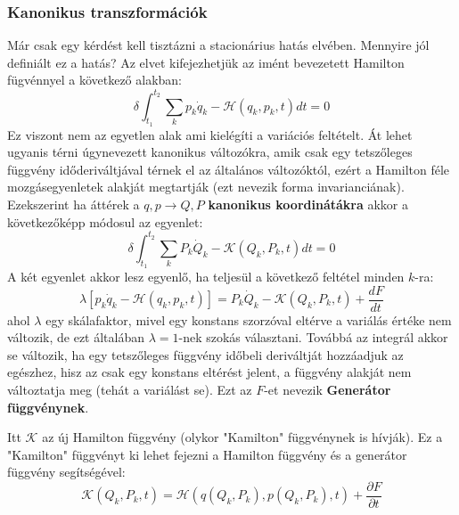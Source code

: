 \documentclass[../main.tex]{subfiles}
\begin{document}
\subsubsection{Kanonikus transzformációk}
Már csak egy kérdést kell tisztázni a stacionárius hatás elvében. Mennyire jól definiált ez a hatás? Az elvet kifejezhetjük az imént bevezetett Hamilton fügvénnyel a következő alakban:
\begin{equation}
    \delta \int_{t_1}^{t_2} \sum_k p_k \dot{q}_k - \mathcal{H}(q_k, p_k, t) dt = 0
\end{equation}
Ez viszont nem az egyetlen alak ami kielégíti a variációs feltételt. Át lehet ugyanis térni úgynevezett kanonikus változókra, amik csak egy tetszőleges függvény időderiváltjával térnek el az általános változóktól, ezért a Hamilton féle mozgásegyenletek alakját megtartják (ezt nevezik forma invarianciának). Ezekszerint ha áttérek a $q,p \to Q,P$ \textbf{kanonikus koordinátákra} akkor a következőképp módosul az egyenlet:
\begin{equation}
    \delta \int_{t_1}^{t_2} \sum_k P_k \dot{Q}_k - \mathcal{K}(Q_k, P_k, t) dt = 0
\end{equation}
A két egyenlet akkor lesz egyenlő, ha teljesül a következő feltétel minden $k$-ra:
\begin{equation}
    \lambda \left[p_k \dot{q}_k - \mathcal{H}(q_k, p_k, t)\right] = P_k \dot{Q}_k - \mathcal{K}(Q_k, P_k, t) + \frac{dF}{dt}
\end{equation}
ahol $\lambda$ egy skálafaktor, mivel egy konstans szorzóval eltérve a variálás értéke nem változik, de ezt általában $\lambda=1$-nek szokás választani. Továbbá az integrál akkor se változik, ha egy tetszőleges függvény időbeli deriváltját hozzáadjuk az egészhez, hisz az csak egy konstans eltérést jelent, a függvény alakját nem változtatja meg (tehát a variálást se). Ezt az $F$-et nevezik \textbf{Generátor függvénynek}.

Itt $\mathcal{K}$ az új Hamilton függvény (olykor "Kamilton" függvénynek is hívják).
Ez a "Kamilton" függvényt ki lehet fejezni a Hamilton függvény és a generátor függvény segítségével:
\begin{equation}
    \mathcal{K}(Q_k, P_k, t) = \mathcal{H}(q(Q_k,P_k), p(Q_k, P_k), t) + \frac{\partial F}{\partial t}
\end{equation}
\end{document}
